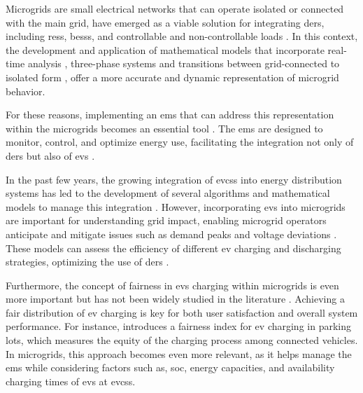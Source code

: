 \documentclass[preprint, 12pt, 3p]{elsarticle}
\begin{document}
Microgrids are small electrical networks that can operate isolated or connected
with the main grid, have emerged as a viable solution for 
integrating \glspl{der}, including \glspl{res}, \glspl{bess}, and controllable 
and non-controllable loads \cite{farrokhabadi2020}. In this context, 
the development and application of mathematical models that incorporate 
real-time analysis \cite{yang2019,restrepo2021}, three-phase 
systems \cite{vergara2019_2} and transitions between grid-connected to 
isolated form \cite{vergara2019}, offer a more accurate and dynamic 
representation of microgrid behavior.


For these reasons, implementing an \gls{ems} that 
can address this representation within the microgrids becomes an essential tool
\cite{cimen2022,kim2022}. The \gls{ems} are designed to monitor, control, 
and optimize energy use, facilitating the integration not only of \glspl{der} 
but also of \glspl{ev} \cite{ahmad2023}.

In the past few years, the growing integration of \glspl{evcs} into energy 
distribution systems has led to the development of several algorithms and 
mathematical models to manage this integration \cite{banol2023, calero2024}. 
However, incorporating \glspl{ev} into 
microgrids are important for understanding grid impact, enabling microgrid 
operators anticipate and mitigate issues such as demand peaks and voltage 
deviations \cite{gou2022}. These models can assess 
the efficiency of different \gls{ev} charging and discharging strategies, 
optimizing the use of \glspl{der} \cite{kayode2022, masrur2022}.

Furthermore, the concept of fairness in \glspl{ev} charging within microgrids is even more important but has not been widely studied in the literature \cite{soares24}. Achieving a fair distribution of 
\gls{ev} charging is key for both user satisfaction and overall system 
performance. For instance, \cite{morais23} introduces a fairness index for 
\gls{ev} charging in parking lots, which measures the equity of the charging 
process among connected vehicles. In microgrids, this approach becomes even 
more relevant, as it helps manage the \gls{ems} while considering factors 
such as, \gls{soc}, energy capacities, and availability charging times of \glspl{ev} at \glspl{evcs}.

\end{document}
